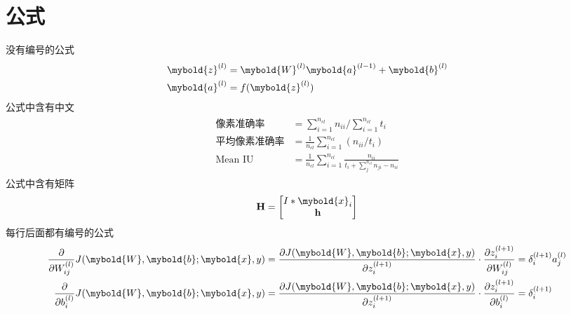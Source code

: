 \section{公式}
\label{sec:formula}
没有编号的公式
\begin{align*}
\begin{split}
	\label{eq:feedforward}
	\mybold{z}^{(l)} & = \mybold{W}^{(l)}\mybold{a}^{(l-1)} + \mybold{b}^{(l)} \\
	\mybold{a}^{(l)} & = f(\mybold{z}^{(l)})
\end{split}
\end{align*}
公式中含有中文
\begin{align}
	\begin{split}
	\mbox{像素准确率} &= \sum_{i=1}^{n_{cl}}n_{ii} / \sum_{i=1}^{n_{cl}}t_i \\
		\mbox{平均像素准确率} &= \frac{1}{n_{cl}} \sum_{i=1}^{n_{cl}}(n_{ii}/ t_i) \\
	\mbox{Mean IU} &= \frac{1}{n_{cl}} \sum_{i=1}^{n_{cl}}\frac{n_{ii}}{t_i + \sum_j^{n_{cl}} n_{ji} - n_{ii}}
	\end{split}
\end{align}
公式中含有矩阵
\begin{equation}
	\textbf{H} = \begin{bmatrix}
		I*\mybold{x}_i \\ \textbf{h}
	\end{bmatrix}
\end{equation}
每行后面都有编号的公式
\begin{align}
	\frac{\partial}{\partial W_{ij}^{(l)}} J(\mybold{W},\mybold{b};\mybold{x},y) &= \frac{\partial J(\mybold{W},\mybold{b};\mybold{x},y)}{\partial z_i^{(l+1)}}\cdot \frac{\partial z_i^{(l+1)}}{\partial W_{ij}^{(l)}} = \delta_i^{(l+1)}a_j^{(l)} \\
	\frac{\partial}{\partial b_i^{(l)}} J(\mybold{W},\mybold{b};\mybold{x},y) &= \frac{\partial J(\mybold{W},\mybold{b};\mybold{x},y)}{\partial z_i^{(l+1)}}\cdot \frac{\partial z_i^{(l+1)}}{\partial b_i^{(l)}} = \delta_i^{(l+1)}
\end{align}

